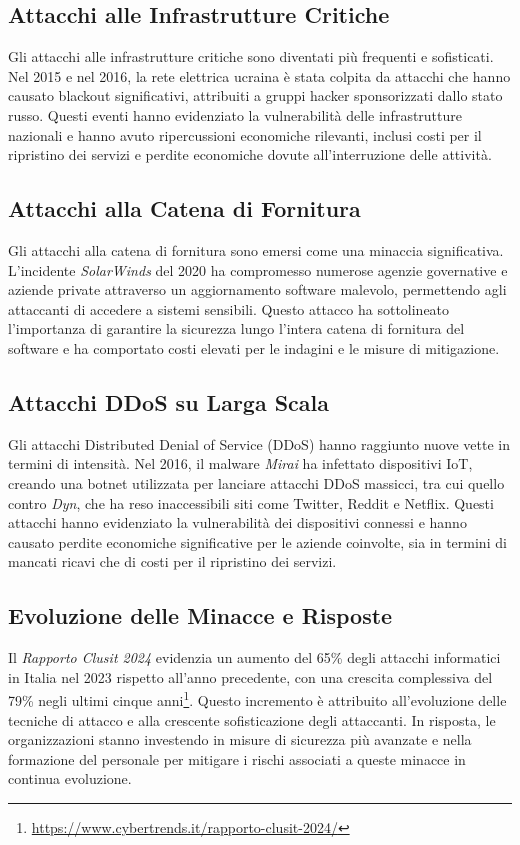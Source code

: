 \subsection*{Attacchi alle Infrastrutture Critiche}
Gli attacchi alle infrastrutture critiche sono diventati più frequenti e sofisticati. Nel 2015 e nel 2016, la rete elettrica ucraina è stata colpita da attacchi che hanno causato blackout significativi, attribuiti a gruppi hacker sponsorizzati dallo stato russo. Questi eventi hanno evidenziato la vulnerabilità delle infrastrutture nazionali e hanno avuto ripercussioni economiche rilevanti, inclusi costi per il ripristino dei servizi e perdite economiche dovute all'interruzione delle attività.

\subsection*{Attacchi alla Catena di Fornitura}
Gli attacchi alla catena di fornitura sono emersi come una minaccia significativa. L'incidente \textit{SolarWinds} del 2020 ha compromesso numerose agenzie governative e aziende private attraverso un aggiornamento software malevolo, permettendo agli attaccanti di accedere a sistemi sensibili. Questo attacco ha sottolineato l'importanza di garantire la sicurezza lungo l'intera catena di fornitura del software e ha comportato costi elevati per le indagini e le misure di mitigazione.

\subsection*{Attacchi DDoS su Larga Scala}
Gli attacchi Distributed Denial of Service (DDoS) hanno raggiunto nuove vette in termini di intensità. Nel 2016, il malware \textit{Mirai} ha infettato dispositivi IoT, creando una botnet utilizzata per lanciare attacchi DDoS massicci, tra cui quello contro \textit{Dyn}, che ha reso inaccessibili siti come Twitter, Reddit e Netflix. Questi attacchi hanno evidenziato la vulnerabilità dei dispositivi connessi e hanno causato perdite economiche significative per le aziende coinvolte, sia in termini di mancati ricavi che di costi per il ripristino dei servizi.

\subsection*{Evoluzione delle Minacce e Risposte}
Il \textit{Rapporto Clusit 2024} evidenzia un aumento del 65\% degli attacchi informatici in Italia nel 2023 rispetto all'anno precedente, con una crescita complessiva del 79\% negli ultimi cinque anni\footnote{\url{https://www.cybertrends.it/rapporto-clusit-2024/}}. Questo incremento è attribuito all'evoluzione delle tecniche di attacco e alla crescente sofisticazione degli attaccanti. In risposta, le organizzazioni stanno investendo in misure di sicurezza più avanzate e nella formazione del personale per mitigare i rischi associati a queste minacce in continua evoluzione.

